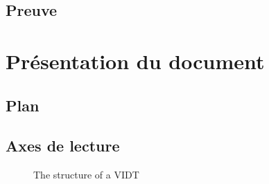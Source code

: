 \subsection{Preuve}

\section{Présentation du document}

\subsection{Plan}

\subsection{Axes de lecture}


\begin{figure}
	\centering
	
	\caption{The structure of a VIDT}
	\label{fig:vidt}
\end{figure}


